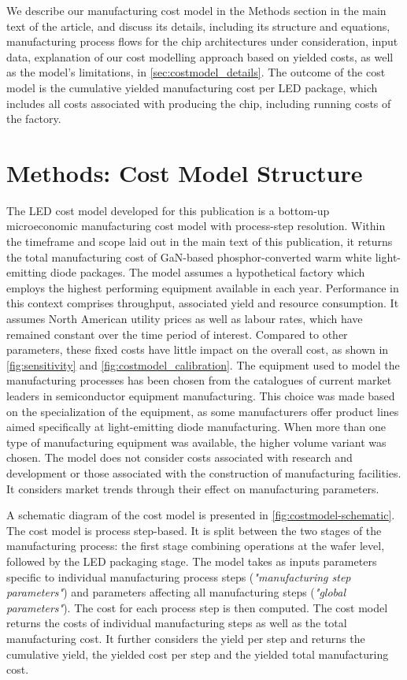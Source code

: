 \documentclass[parskip=full]{article}
\begin{document}
We describe our manufacturing cost model in the Methods section in the main text of the article, and discuss its details, including its structure and equations, manufacturing process flows for the chip architectures under consideration, input data, explanation of our cost modelling approach based on yielded costs, as well as the model’s limitations, in \cref{sec:costmodel_details}. The outcome of the cost model is the cumulative yielded manufacturing cost per LED package, which includes all costs associated with producing the chip, including running costs of the factory.

\clearpage
\section{Methods: Cost Model Structure}
\label{sec:costmodel_structure}

The LED cost model developed for this publication is a bottom-up microeconomic manufacturing cost model with process-step resolution. Within the timeframe and scope laid out in the main text of this publication, it returns the total manufacturing cost of GaN-based phosphor-converted warm white light-emitting diode packages. The model assumes a hypothetical factory which employs the highest performing equipment available in each year. Performance in this context comprises throughput, associated yield and resource consumption. It assumes North American utility prices as well as labour rates, which have remained constant over the time period of interest. Compared to other parameters, these fixed costs have little impact on the overall cost, as shown in \cref{fig:sensitivity} and \cref{fig:costmodel_calibration}. The equipment used to model the manufacturing processes has been chosen from the catalogues of current market leaders in semiconductor equipment manufacturing. This choice was made based on the specialization of the equipment, as some manufacturers offer product lines aimed specifically at light-emitting diode manufacturing. When more than one type of manufacturing equipment was available, the higher volume variant was chosen. The model does not consider costs associated with research and development or those associated with the construction of manufacturing facilities. It considers market trends through their effect on manufacturing parameters. 

A schematic diagram of the cost model is presented in \cref{fig:costmodel-schematic}. The cost model is process step-based. It is split between the two stages of the manufacturing process: the first stage combining operations at the wafer level, followed by the LED packaging stage. The model takes as inputs parameters specific to individual manufacturing process steps (\textit{"manufacturing step parameters"}) and parameters affecting all manufacturing steps (\textit{"global parameters"}). The cost for each process step is then computed. The cost model returns the costs of individual manufacturing steps as well as the total manufacturing cost. It further considers the yield per step and returns the cumulative yield, the yielded cost per step and the yielded total manufacturing cost.
\end{document}
